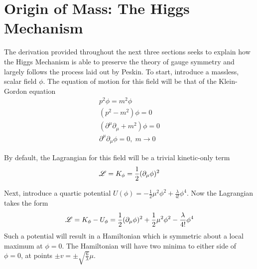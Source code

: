 \section{Origin of Mass: The Higgs Mechanism}\label{sec:higgs_mechanism}

    The derivation provided throughout the next three sections seeks to explain
        how the Higgs Mechanism is able to preserve the theory of gauge symmetry
        and largely follows the process laid out by Peskin\cite{Peskin_book}.
    To start, introduce a massless, scalar field $\phi$.
    The equation of motion for this field will be that of the Klein-Gordon equation
    \begin{equation} \begin{split}
        p^2 \phi = m^2 \phi
        \\(p^2 - m^2) \phi = 0
        \\(\partial^\mu \partial_\mu + m^2) \phi = 0
        \\\partial^\mu \partial_\mu \phi = 0,\; m\to0
    \end{split} \end{equation}

    By default, the Lagrangian for this field will be a trivial kinetic-only term
    \begin{equation}
        \mathscr{L} = K_{\phi} = \frac{1}{2} (\partial_{\mu} \phi)^2
    \end{equation}
    
    Next, introduce a quartic potential $U(\phi) = -\frac{1}{2} \mu^2 \phi^2 + \frac{\lambda}{4!} \phi^4$.
    Now the Lagrangian takes the form
    \begin{equation}
        \mathscr{L} = K_{\phi} - U_{\phi} = \frac{1}{2} (\partial_{\mu} \phi)^2 
            +\frac{1}{2} \mu^2 \phi^2 - \frac{\lambda}{4!} \phi^4
    \end{equation}
    Such a potential will result in a Hamiltonian which is symmetric about a local maximum at $\phi=0$.
    The Hamiltonian will have two minima to either side of $\phi=0$, at points $\pm v = \pm \sqrt{\frac{6}{\lambda}} \mu$.

